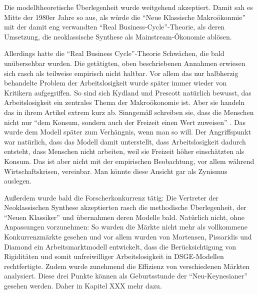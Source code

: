 Die modelltheoretische Überlegenheit wurde weitgehend akzeptiert. Damit sah es Mitte der 1980er Jahre so aus, als würde die "`Neue Klassische Makroökonmie"' mit der damit eng verwandten "`Real Business-Cycle"'-Theorie, als deren Umsetzung,  die neoklassische Synthese als Mainstream-Ökonomie ablösen.

Allerdings hatte die "`Real Business Cycle"'-Theorie Schwächen, die bald unübersehbar wurden. Die getätigten, oben beschriebenen Annahmen erwiesen sich rasch als teilweise empirisch nicht haltbar. 
Vor allem das nur halbherzig behandelte Problem der Arbeitslosigkeit wurde später immer wieder von Kritikern aufgegriffen. So sind sich Kydland und Prescott natürlich bewusst, das Arbeitslosigkeit ein zentrales Thema der Makroökonomie ist. Aber sie handeln das in ihrem Artikel extrem kurz ab. Sinngemäß schreiben sie, dass die Menschen nicht nur "`dem Konsum, sondern auch der Freizeit einen Wert zuweisen"' \parencite[S. 1345]{Kydland1982}. Das wurde dem Modell später zum Verhängnis, wenn man so will. Der Angriffspunkt war natürlich, dass das Modell damit unterstellt, dass Arbeitslosigkeit dadurch entsteht, dass Menschen nicht arbeiten, weil sie Freizeit höher einschätzten als Konsum.
Das ist aber nicht mit der empirischen Beobachtung, vor allem während Wirtschaftskrisen, vereinbar. Man könnte diese Ansicht gar als Zynismus auslegen.

Außerdem wurde bald die Forscherkonkurrenz tätig: Die Vertreter der Neoklassischen Synthese akzeptierten rasch die methodische Überlegenheit, der "`Neuen Klassiker"' und übernahmen deren Modelle bald. Natürlich nicht, ohne Anpassungen vorzunehmen: So wurden die Märkte nicht mehr als vollkommene Konkurrenzmärkte gesehen und vor allem wurden von Mortensen, Pissaridis und Diamond ein Arbeitsmarktmodell entwickelt, dass die Berücksichtigung von Rigiditäten und somit unfreiwilliger Arbeitslosigkeit in DSGE-Modellen rechtfertigte. Zudem wurde zunehmend die Effizienz von verschiedenen Märkten analysiert. Diese drei Punkte können als Geburtsstunde der "`Neu-Keynesianer"' gesehen werden. Daher in Kapitel XXX mehr dazu.

